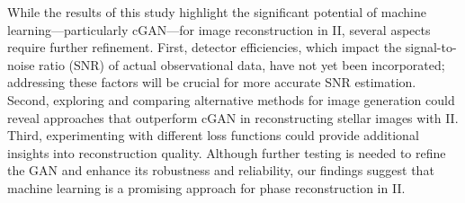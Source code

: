 While the results of this study highlight the significant potential of machine learning—particularly cGAN—for image reconstruction in II, several aspects require further refinement. First, detector efficiencies, which impact the signal-to-noise ratio (SNR) of actual observational data, have not yet been incorporated; addressing these factors will be crucial for more accurate SNR estimation. Second, exploring and comparing alternative methods for image generation could reveal approaches that outperform cGAN in reconstructing stellar images with II. Third, experimenting with different loss functions could provide additional insights into reconstruction quality. Although further testing is needed to refine the GAN and enhance its robustness and reliability, our findings suggest that machine learning is a promising approach for phase reconstruction in II.
